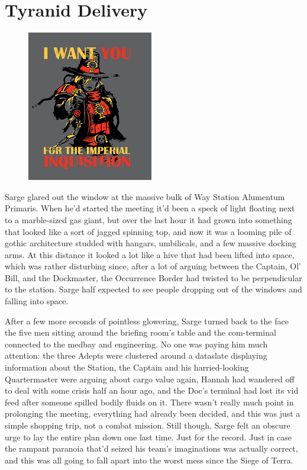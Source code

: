 \chapter{Tyranid Delivery}

\begin{figure}
	\begin{center}
		\includegraphics[width=\figwidth]{pics/14/1.png}
	\end{center}
\end{figure}
Sarge glared out the window at the massive bulk of Way Station Alumentum Primaris. 
When he'd started the meeting it'd been a speck of light floating next to a marble-sized gas giant, but over the last hour it had grown into something that looked like a sort of jagged spinning top, and now it was a looming pile of gothic architecture studded with hangars, umbilicals, and a few massive docking arms. 
At this distance it looked a lot like a hive that had been lifted into space, which was rather disturbing since, after a lot of arguing between the Captain, Ol' Bill, and the Dockmaster, the Occurrence Border had twisted to be perpendicular to the station. 
Sarge half expected to see people dropping out of the windows and falling into space.

After a few more seconds of pointless glowering, Sarge turned back to the face the five men sitting around the briefing room's table and the com-terminal connected to the medbay and engineering. 
No one was paying him much attention: 
the three Adepts were clustered around a dataslate displaying information about the Station, the Captain and his harried-looking Quartermaster were arguing about cargo value again, Hannah had wandered off to deal with some crisis half an hour ago, and the Doc's terminal had lost its vid feed after someone spilled bodily fluids on it. 
There wasn't really much point in prolonging the meeting, everything had already been decided, and this was just a simple shopping trip, not a combat mission. 
Still though, Sarge felt an obscure urge to lay the entire plan down one last time. 
Just for the record. 
Just in case the rampant paranoia that'd seized his team's imaginations was actually correct, and this was all going to fall apart into the worst mess since the Siege of Terra.

